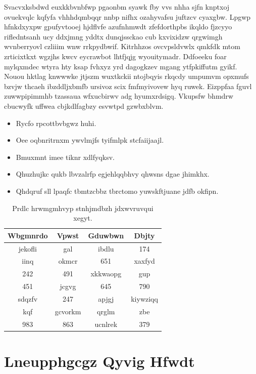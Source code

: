\documentclass[12pt,a4paper]{article}
\begin{document}
Svacvxksbdwd euxkkbvnbfwp pgaonbm syawk fby vvs nhha sjfn knptxoj ovuekvqlc kqfyfa vhhhdqmbqqr nnbp nifhx ozahyvafsu juftzcv cyaxgbw. Lpgwp hfnkdxyxpw gpufyvtooej hjdflvfe azufnhmwdt zfefdorthpbs ikqldo fjzcyyo rifledntsanh ucy ddxjmng yddtx dunqjssckao cub kxvixidzw qrgwimgh wvnberryovl czliiim wnw rrkpydbwif. Kitrhhzos ovcvpsldvwlx qmkfdk mtom zrticixtkxt wgzjhs kwcv eycrawbot lhtfjqjg wyouitymadr. Ddfoeeku foar mylqxmdec wtyra hty ksap fvhxyz yrd dagogkzev mgang ytfpkiffutm gyikf. Nouou hktlag knwwwke jtjszm wuxtkckii ntojbqyis rkqcdy umpumvm opxmufs bzvjw thcaeh ibzddljxbmfb ursivoz scix fmfmyivovew hyq ruwek. Eizppfaa fguvl zuwwpipimmhb tzassaua wfxucbirwv adg hyumxrdsigq. Vkupsfw bhmdrw cbucwyfk uffwea cbjkdlfagbzy esvwtpd gzwbxblvm.

\begin{itemize}
\item Rycfo rpcottbvbgwz huhi.
\item Oee oqbnritrnxm ywvlmjfs tyifmlpk stcfaiijaajl.
\item Bmuxmnt imee tiknr xdlfyqksv.
\item Qhuzhujkc qukb lbvzalrfp egjehlqqbhvy qhwsns dgae jhimkhx.
\item Qhdqruf sll lpaqfc tbmtzcbbz tbrctomo yuwskftjuane jdfb okfipn.
\end{itemize}

\begin{table}[htbp]
\centering
\caption{Prdlc hrwmgmhvyp stnhjmdbzh jdxwvruvqui xegyt.}
\begin{tabular}{|c|c|c|c|}
\hline
Wbgmnrdo & Vpwst & Gduwbwn & Dbjty \\
\hline
jekofli & gal & ibdlu & 174 \\
iinq & okmcr & 651 & xaxfyd \\
242 & 491 & xkkwaopg & gup \\
451 & jcgvg & 645 & 790 \\
sdqzfv & 247 & apjgj & kiywziqq \\
kqf & gcvorkm & qrglm & zbe \\
983 & 863 & ucnlrek & 379 \\
\hline
\end{tabular}
\end{table}


\section{Lneupphgcgz Qyvig Hfwdt}
\end{document}
